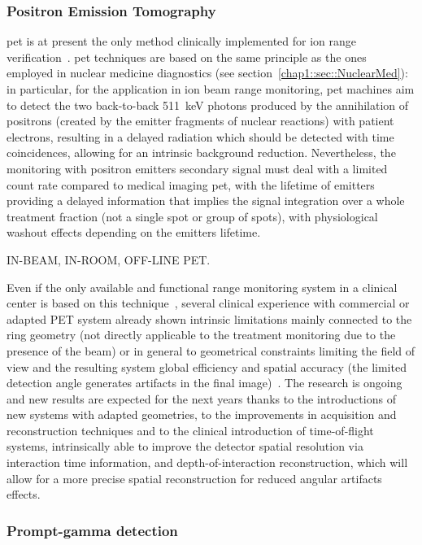 \subsubsection{Positron Emission Tomography}\label{chap1::subsubsec::RangePET}
\gls{pet} is at present the only method clinically implemented for ion range verification~\parencite{Hishikawa2002, Enghardt2004, Parodi2007, Bauer2013}. \gls{pet} techniques are based on the same principle as the ones employed in nuclear medicine diagnostics (see section~\ref{chap1::sec::NuclearMed}): in particular, for the application in ion beam range monitoring, \gls{pet} machines aim to detect the two back-to-back 511~keV photons produced by the annihilation of positrons (created by the emitter fragments of nuclear reactions) with patient electrons, resulting in a delayed radiation which should be detected with time coincidences, allowing for an intrinsic background reduction. Nevertheless, the monitoring with positron emitters secondary signal must deal with a limited count rate compared to medical imaging \gls{pet}, with the lifetime of emitters providing a delayed information that implies the signal integration over a whole treatment fraction (not a single spot or group of spots), with physiological washout effects depending on the emitters lifetime.

IN-BEAM, IN-ROOM, OFF-LINE PET. 

Even if the only available and functional range monitoring system in a clinical center is based on this technique~\parencite{Enghardt2004}, several clinical experience with commercial or adapted PET system already shown intrinsic limitations mainly connected to the ring geometry (not directly applicable to the treatment monitoring due to the presence of the beam) or in general to geometrical constraints limiting the field of view and the resulting system global efficiency and spatial accuracy (the limited detection angle generates artifacts in the final image)~\parencite{Parodi2015}. The research is ongoing and new results are expected for the next years thanks to the introductions of new systems with adapted geometries, to the improvements in acquisition and reconstruction techniques and to the clinical introduction of time-of-flight systems, intrinsically able to improve the detector spatial resolution via interaction time information, and depth-of-interaction reconstruction, which will allow for a more precise spatial reconstruction for reduced angular artifacts effects.

\subsubsection{Prompt-gamma detection}\label{chap1::subsec::PGgeneral}



